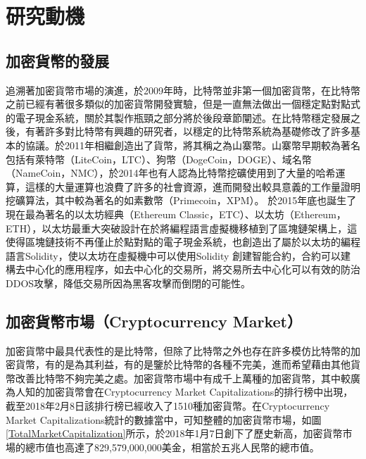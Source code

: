 
\chapter{研究動機}
	\section{加密貨幣的發展}
	追溯著加密貨幣市場的演進，於2009年時，比特幣並非第一個加密貨幣，在比特幣之前已經有著很多類似的加密貨幣開發實驗，但是一直無法做出一個穩定點對點式的電子現金系統，關於其製作瓶頸之部分將於後段章節闡述。在比特幣穩定發展之後，有著許多對比特幣有興趣的研究者，以穩定的比特幣系統為基礎修改了許多基本的協議。於2011年相繼創造出了貨幣，將其稱之為⼭寨幣。山寨幣早期較為著名包括有萊特幣（LiteCoin，LTC）\supercite{litecoin}、狗幣（DogeCoin，DOGE）\supercite{dogecoin}、域名幣（NameCoin，NMC）\supercite{namecoin}，於2014年也有人認為比特幣挖礦使用到了大量的哈希運算，這樣的大量運算也浪費了許多的社會資源，進而開發出較具意義的工作量證明挖礦算法，其中較為著名的如素數幣（Primecoin，XPM）\supercite{primecoin}。 於2015年底也誕生了現在最為著名的以太坊經典（Ethereum Classic，ETC）\supercite{ethereumclassic}、以太坊（Ethereum，ETH）\supercite{ethereum}，以太坊最重⼤突破設計在於將編程語⾔虛擬機移植到了區塊鏈架構上，這使得區塊鏈技術不再僅止於點對點的電⼦現⾦系統，也創造出了屬於以太坊的編程語言Solidity\supercite{solidity}，使以太坊在虛擬機中可以使⽤Solidity 創建智能合約，合約可以建構去中心化的應用程序，如去中心化的交易所，將交易所去中心化可以有效的防治DDOS攻擊，降低交易所因為黑客攻擊而倒閉的可能性。

	\section{加密貨幣市場（Cryptocurrency Market）}
	加密貨幣中最具代表性的是比特幣，但除了比特幣之外也存在許多模仿比特幣的加密貨幣，有的是為其利益，有的是鑒於比特幣的各種不完美，進而希望藉由其他貨幣改善⽐特幣不夠完美之處。加密貨幣市場中有成千上萬種的加密貨幣，其中較廣為人知的加密貨幣會在Cryptocurrency Market Capitalizations\supercite{CryptocurrencyMarketCapitalizations}的排行榜中出現，截至2018年2月8日該排行榜已經收入了1510種加密貨幣。在Cryptocurrency Market Capitalizations統計的數據當中，可知整體的加密貨幣市場，如圖\ref{TotalMarketCapitalization}所示，於2018年1月7日創下了歷史新高，加密貨幣市場的總市值也高達了829,579,000,000美金，相當於五兆人民幣的總市值。

